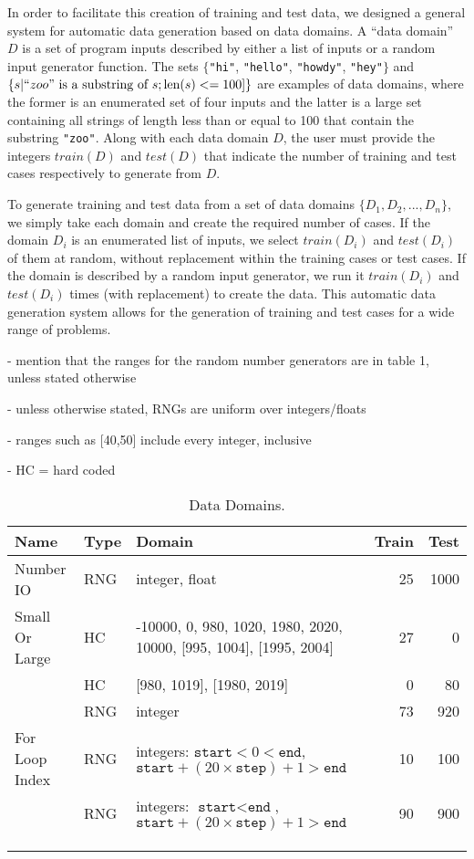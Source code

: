 \documentclass{sig-alternate}
\begin{document}

In order to facilitate this creation of training and test data, we designed a general system for automatic data generation based on data domains. A ``data domain'' $D$ is a set of program inputs described by either a list of inputs or a random input generator function. The sets $\{$\texttt{"hi"}, \texttt{"hello"}, \texttt{"howdy"}, \texttt{"hey"}$\}$ and $\{s | ``zoo" \text{ is a substring of } s; \text{len}(s) <= 100] \}$ are examples of data domains, where the former is an enumerated set of four inputs and the latter is a large set containing all strings of length less than or equal to 100 that contain the substring \texttt{"zoo"}. Along with each data domain $D$, the user must provide the integers $train(D)$ and $test(D)$ that indicate the number of training and test cases respectively to generate from $D$.

To generate training and test data from a set of data domains $\{D_1, D_2, ..., D_n \}$, we simply take each domain and create the required number of cases. If the domain $D_i$ is an enumerated list of inputs, we select $train(D_i)$ and $test(D_i)$ of them at random, without replacement within the training cases or test cases. If the domain is described by a random input generator, we run it $train(D_i)$ and $test(D_i)$ times (with replacement) to create the data. This automatic data generation system allows for the generation of training and test cases for a wide range of problems.


- mention that the ranges for the random number generators are in table 1, unless stated otherwise

- unless otherwise stated, RNGs are uniform over integers/floats

- ranges such as [40,50] include every integer, inclusive

- HC = hard coded



\begin{table*}[t]
\centering
\caption{Data Domains.}
\label{whatwhat}
\begin{tabular}{lllrr}
\toprule
\textbf{Name} & \textbf{Type} & \textbf{Domain} & \textbf{Train} & \textbf{Test} \\
\midrule
Number IO & RNG & integer, float & 25 & 1000 \tabularnewline
Small Or Large & HC & -10000, 0, 980, 1020, 1980, 2020, 10000, [995, 1004], [1995, 2004] & 27 & 0 \tabularnewline
 & HC & [980, 1019], [1980, 2019] & 0 & 80 \tabularnewline
 & RNG & integer & 73 & 920 \tabularnewline
For Loop Index & RNG & integers: $\texttt{start} < 0 < \texttt{end}$, $ \texttt{start} + (20 \times \texttt{step}) + 1 > \texttt{end}$ & 10 & 100 \tabularnewline
 & RNG & integers: $\texttt{start} < \texttt{end}$, $ \texttt{start} + (20 \times \texttt{step}) + 1 > \texttt{end}$ & 90 & 900 \tabularnewline
 &  &  &  &  \tabularnewline
 &  &  &  &  \tabularnewline
 &  &  &  &  \tabularnewline
\bottomrule
\end{tabular}
\end{table*}
\end{document}
